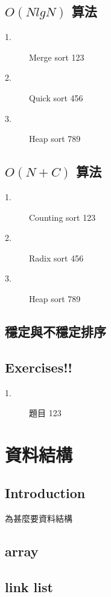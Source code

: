 \documentclass{article}
\begin{document}
\subsection{ $O(N lg N)$ 算法}
\begin{description}
\item[ 1.]Merge sort
123
\item[ 2.]Quick sort
456
\item[ 3.]Heap sort
789
\end{description} 

\subsection{ $O(N + C)$ 算法}
\begin{description}
\item[ 1.]Counting sort
123
\item[ 2.]Radix sort
456
\item[ 3.]Heap sort
789
\end{description} 

\subsection{穩定與不穩定排序}

\subsection{Exercises!!}
\begin{description}
\item[ 1.]題目
123
\end{description} 


\section{資料結構}

\subsection*{Introduction}
為甚麼要資料結構

\subsection{array}

\subsection{link list}
\end{document}
